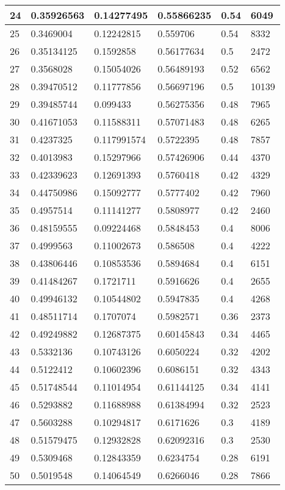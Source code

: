 \begin{longtable}{|l|l|l|l|l|l|}
24 & 0.35926563 & 0.14277495 & 0.55866235 & 0.54 & 6049 \\ \hline 
25 & 0.3469004 & 0.12242815 & 0.559706 & 0.54 & 8332 \\ \hline 
26 & 0.35134125 & 0.1592858 & 0.56177634 & 0.5 & 2472 \\ \hline 
27 & 0.3568028 & 0.15054026 & 0.56489193 & 0.52 & 6562 \\ \hline 
28 & 0.39470512 & 0.11777856 & 0.56697196 & 0.5 & 10139 \\ \hline 
29 & 0.39485744 & 0.099433 & 0.56275356 & 0.48 & 7965 \\ \hline 
30 & 0.41671053 & 0.11588311 & 0.57071483 & 0.48 & 6265 \\ \hline 
31 & 0.4237325 & 0.117991574 & 0.5722395 & 0.48 & 7857 \\ \hline 
32 & 0.4013983 & 0.15297966 & 0.57426906 & 0.44 & 4370 \\ \hline 
33 & 0.42339623 & 0.12691393 & 0.5760418 & 0.42 & 4329 \\ \hline 
34 & 0.44750986 & 0.15092777 & 0.5777402 & 0.42 & 7960 \\ \hline 
35 & 0.4957514 & 0.11141277 & 0.5808977 & 0.42 & 2460 \\ \hline 
36 & 0.48159555 & 0.09224468 & 0.5848453 & 0.4 & 8006 \\ \hline 
37 & 0.4999563 & 0.11002673 & 0.586508 & 0.4 & 4222 \\ \hline 
38 & 0.43806446 & 0.10853536 & 0.5894684 & 0.4 & 6151 \\ \hline 
39 & 0.41484267 & 0.1721711 & 0.5916626 & 0.4 & 2655 \\ \hline 
40 & 0.49946132 & 0.10544802 & 0.5947835 & 0.4 & 4268 \\ \hline 
41 & 0.48511714 & 0.1707074 & 0.5982571 & 0.36 & 2373 \\ \hline 
42 & 0.49249882 & 0.12687375 & 0.60145843 & 0.34 & 4465 \\ \hline 
43 & 0.5332136 & 0.10743126 & 0.6050224 & 0.32 & 4202 \\ \hline 
44 & 0.5122412 & 0.10602396 & 0.6086151 & 0.32 & 4343 \\ \hline 
45 & 0.51748544 & 0.11014954 & 0.61144125 & 0.34 & 4141 \\ \hline 
46 & 0.5293882 & 0.11688988 & 0.61384994 & 0.32 & 2523 \\ \hline 
47 & 0.5603288 & 0.10294817 & 0.6171626 & 0.3 & 4189 \\ \hline 
48 & 0.51579475 & 0.12932828 & 0.62092316 & 0.3 & 2530 \\ \hline 
49 & 0.5309468 & 0.12843359 & 0.6234754 & 0.28 & 6191 \\ \hline 
50 & 0.5019548 & 0.14064549 & 0.6266046 & 0.28 & 7866 \\ \hline 
\end{longtable}